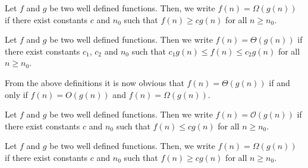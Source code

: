 	\begin{definition}
		Let $f$ and $g$ be two well defined functions. Then, we write $f(n) = \Omega(g(n))$ if there exist constants $c$ and $n_0$ such that $f(n)\ge cg(n)$ for all $n\ge n_0$.
	\end{definition}
	\begin{definition}
		Let $f$ and $g$ be two well defined functions. Then we write $f(n) = \Theta(g(n))$ if there exist constants $c_1$, $c_2$ and $n_0$ such that $c_1g(n)\le f(n)\le c_2g(n)$ for all $n\ge n_0$.
	\end{definition}
	From the above definitions it is now obvious that $f(n) = \Theta(g(n))$ if and only if $f(n) = O(g(n))$ and $f(n) = \Omega(g(n))$.

	\begin{definition}
		Let $f$ and $g$ be two well defined functions. Then we write $f(n) = \mathcal{O}(g(n))$ if there exist constants $c$ and $n_0$ such that $f(n)\le cg(n)$ for all $n\ge n_0$.
	\end{definition}
	\begin{definition}
		Let $f$ and $g$ be two well defined functions. Then, we write $f(n) = \Omega(g(n))$ if there exist constants $c$ and $n_0$ such that $f(n)\ge cg(n)$ for all $n\ge n_0$.
	\end{definition}